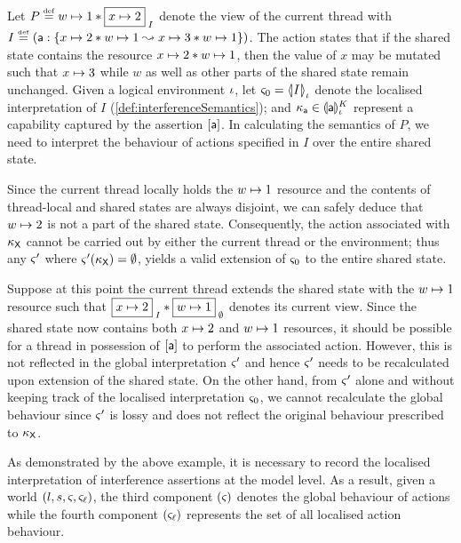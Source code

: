 \begin{example}[]Let $P \eqdef \cell{w}{1} * \shared{\cell{x}{2}}{I}$ denote the view of the current thread with $I \eqdef \left(\token{a}: \left\{\cell{x}{2} * \cell{w}{1} \swap \cell{x}{3} * \cell{w}{1}\right\}\right)$. The action  states that if the shared state contains the resource $\cell{x}{2} * \cell{w}{1}$, then the value of $x$ may be mutated such that $\cell{x}{3}$ while $w$ as well as other parts of the shared state remain unchanged. Given a logical environment $\lenv$, let $\amod{0} = \semI[\lenv]{I}$ denote the localised interpretation of $I$ (\ref{def:interferenceSemantics}); and $\ca{\token{a}} \in  \semK[\lenv]{\token{a}}$ represent a capability captured by the assertion $[\token{a}]$. In calculating the semantics of $P$, we need to interpret the behaviour of actions specified in $I$ over the entire shared state.

Since the current thread locally holds the $\cell{w}{1}$ resource and the contents of thread-local and shared states are always disjoint, we can safely deduce that $\cell{w}{2}$ is not a part of the shared state. Consequently, the action associated with $\ca{\textsf{X}}$ cannot be carried out by either the current thread or the environment; thus any $\amod{}'$ where $\amod{}'(\ca{\textsf{X}}) = \emptyset$, yields a valid extension of $\amod{0}$ to the entire shared state.

Suppose at this point the current thread extends the shared state with the $\cell{w}{1}$ resource such that $\shared{\cell{x}{2}}{I} * \shared{\cell{w}{1}}{\emptyset}$ denotes its current view. Since the shared state now contains both $\cell{x}{2}$ and $\cell{w}{1}$ resources, it should be possible for a thread in possession of $[\token{a}]$ to perform the associated action. However, this is not reflected in the global interpretation $\amod{}'$ and hence $\amod{}'$ needs to be recalculated upon extension of the shared state. On the other hand, from $\amod{}'$ alone and without keeping track of the localised interpretation $\amod{0}$, we cannot recalculate the global behaviour since $\amod{}'$ is lossy and does not reflect the original behaviour prescribed to $\ca{\textsf{X}}$.
\end{example}
As demonstrated by the above example, it is necessary to record the localised interpretation of interference assertions at the model level. As a result, given a world $(l, s, \amod{}, \amod{\ell})$, the third component $(\amod{})$ denotes the global behaviour of actions while the fourth component $(\amod{\ell})$ represents the set of all localised action behaviour.
